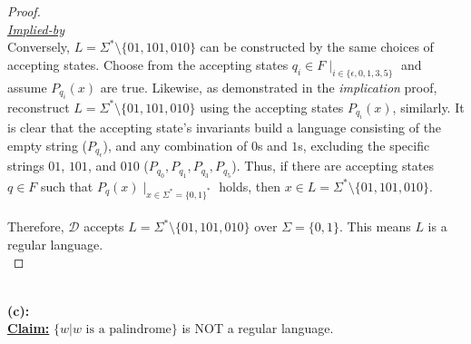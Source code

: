 \documentclass[12pt]{article}
\begin{document}
\begin{proof}
    \\
    \underline{\textit{Implied-by}} \\
    Conversely, $L = \Sigma^* \setminus \{01, 101, 010\}$ can be constructed by the same choices of accepting states. Choose from the accepting states $q_i \in F \mid_{i \in \{\epsilon, 0, 1, 3, 5\}}$ and assume $P_{q_i}(x)$ are true. Likewise, as demonstrated in the \textit{implication} proof, reconstruct $L = \Sigma^* \setminus \{01, 101, 010\}$ using the accepting states $P_{q_i}(x)$, similarly. It is clear that the accepting state's invariants build a language consisting of the empty string ($P_{q_{\epsilon}}$), and any combination of $0$s and $1$s, excluding the specific strings $01$, $101$, and $010$ ($P_{q_0}, P_{q_1}, P_{q_3}, P_{q_5}$). Thus, if there are accepting states $q \in F$ such that $P_q(x) \mid_{x \in \Sigma^* = \{0, 1\}^*}$ holds, then $x \in L = \Sigma^* \setminus \{01, 101, 010\}$. \\
    \\
    Therefore, $\mathcal{D}$ accepts $L = \Sigma^* \setminus \{01, 101, 010\}$ over $\Sigma = \{0, 1\}$. This means $L$ is a regular language. \\
\end{proof}
\leavevmode\\
\textbf{(c):} \\
\textbf{\underline{Claim:}} $\{ w | w \text{ is a palindrome} \}$ is NOT a regular language. \\
\end{document}
